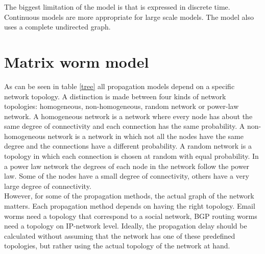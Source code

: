 The biggest limitation of the model is that is expressed in discrete time. Continuous models are more appropriate for large scale models. The model also uses a complete undirected graph.







\section{Matrix worm model}
\label{eigenmatrixmethode}

As can be seen in table \ref{tree} all propagation models depend on a specific network topology. A distinction is made between four kinds of network topologies: homogeneous, non-homogeneous, random network or power-law network. A homogeneous network is a network where every node has about the same degree of connectivity and each connection has the same probability. A non-homogeneous network is a network in which not all the nodes have the same degree and the connections have a different probability.
A random network is a topology in which each connection is chosen at random with equal probability. In a power law network the degrees of each node in the network follow the power law. Some of the nodes have a small degree of connectivity, others have a very large degree of connectivity.\\

However, for some of the propagation methods, the actual graph of the network matters. Each propagation method depends on having the right topology. Email worms need a topology that correspond to a social network, BGP routing worms need a topology on IP-network level. 
Ideally, the propagation delay should be calculated without assuming that the network has one of these predefined topologies, but rather using the actual topology of the network at hand. \\

